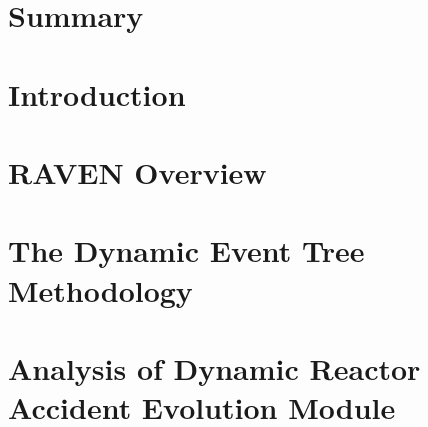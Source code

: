 \documentclass[pdf,ps2pdf,12pt]{INLreport}
\begin{document}
    \clearpage
    \section*{Summary}
    




    \SANDmain		%

    \section{Introduction}
    

    \section{RAVEN Overview}
    

    \section{The Dynamic Event Tree Methodology}
   

    \section{Analysis of Dynamic Reactor Accident Evolution Module}
   
\end{document}
